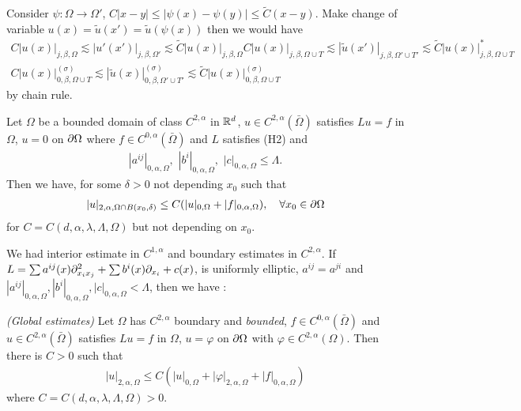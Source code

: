 \documentclass[10pt,a4paper]{article}
\begin{document}
Consider $\psi : \Omega \rightarrow \Omega'$, $C |x-y| \leq |\psi(x) - \psi(y)| \leq \tilde{C}(x-y)$. Make change of variable $u(x) = \tilde{u}(x')= \tilde{u}(\psi(x))$ then we would have
\begin{align*}
C |u(x)|_{j, \beta, \Omega} \lesssim |u'(x')|_{j, \beta, \Omega'}\lesssim \tilde{C} |u(x)|_{j, \beta, \Omega}
C |u(x)|_{j, \beta, \Omega\cup T} \lesssim |\tilde{u}(x')|_{j, \beta, \Omega'\cup T'} \lesssim \tilde{C} |u(x)|^*_{j, \beta, \Omega\cup T} \\
C |u(x)|^{(\sigma)}_{0, \beta, \Omega\cup T} \lesssim |\tilde{u}(x)|^{(\sigma)}_{0, \beta, \Omega'\cup T'} \lesssim \tilde{C} |u(x)|^{(\sigma)}_{0, \beta, \Omega \cup T}
\end{align*}
by chain rule.
\s

 Let $\Omega$ be a bounded domain of class $C^{2, \alpha}$ in $\mathbb{R}^d$, $u\in C^{2, \alpha}(\bar{\Omega})$ satisfies $Lu = f$ in $\Omega$, $u =0$ on $\partial \Omega$ where $f\in C^{0, \alpha}(\bar{\Omega})$ and $L$ satisfies (H2) and
\begin{align*}
|a^{ij}|_{0, \alpha, \Omega}, \,\, |b^{i}|_{0, \alpha, \Omega},\,\, |c|_{0, \alpha, \Omega} \leq \Lambda.
\end{align*}
Then we have, for some $\delta>0$ not depending $x_0$ such that
\begin{align*}
|u|_{2, \alpha, \Omega \cap B(x_0, \delta)} \leq C(|u|_{0, \Omega} + |f|_{0, \alpha, \Omega}), \quad \forall x_0 \in \partial \Omega
\end{align*} 
for $C = C(d, \alpha, \lambda, \Lambda, \Omega)$ but not depending on $x_0$.
\s

\s

We had interior estimate in $C^{1, \alpha}$ and boundary estimates in $C^{2, \alpha}$. If $L = \sum a^{ij}(x) \partial^2_{x_i x_j} + \sum b^i(x) \partial_{x_i} + c(x)$, is uniformly elliptic, $a^{ij} =a^{ji}$ and $|a^{ij}|_{0, \alpha, \Omega}, |b^i|_{0, \alpha, \Omega}, |c|_{0, \alpha, \Omega}< \Lambda$, then we have :
\s

\thm \emph{(Global estimates)} Let $\Omega$ has $C^{2, \alpha}$ boundary and \emph{bounded}, $f\in C^{0, \alpha}(\bar{\Omega})$ and $u\in C^{2, \alpha}(\bar{\Omega})$ satisfies $Lu =f$ in $\Omega$, $u = \varphi$ on $\partial \Omega$ with $\varphi \in C^{2, \alpha}(\Omega)$. Then there is $C >0$ such that
\begin{align*}
|u|_{2, \alpha, \Omega} \leq C (|u|_{0, \Omega} + |\varphi|_{2, \alpha, \Omega} + |f|_{0, \alpha, \Omega})
\end{align*}
where $C = C(d, \alpha, \lambda, \Lambda, \Omega)>0$.
\end{document}
